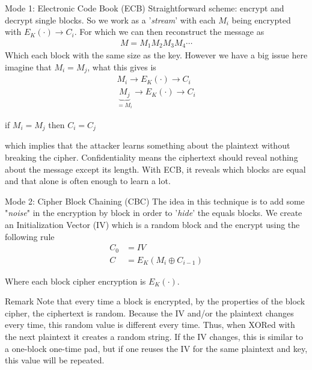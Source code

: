 \begin{parag}{Mode 1: Electronic Code Book (ECB)}
	Straightforward scheme: encrypt and decrypt single blocks. So we work as a '\textit{stream}' with each $M_i$ being encrypted with $E_K\left(\cdot \right) \to C_i$. For which we can then reconstruct the message as 
	\begin{align*} 
		M = M_1M_2M_3M_4\cdots 
	\end{align*}
	Which each block with the same size as the key. However we have a big issue here imagine that $M_i =  M_j$, what this gives is 
	\begin{align*} 
		M_i \to E_K\left(\cdot \right) \to C_i \\
		\underbrace{M_j}_{= M_i} \to E_K\left(\cdot \right) \to C_i
	\end{align*}
	\begin{center}
	    if $M_i = M_j$ then $C_i =  C_j$
	\end{center}
	which implies that the attacker learns something about the plaintext without breaking the cipher. Confidentiality means the ciphertext should reveal nothing about the message except its length. With ECB, it reveals which blocks are equal and that alone is often enough to learn a lot.
	
\end{parag}
\begin{parag}{Mode 2: Cipher Block Chaining (CBC)}
    The idea in this technique is to add some "\textit{noise}" in the encryption by block in order to '\textit{hide}' the equals blocks. We create an Initialization Vector (IV) which is a random block and the encrypt using the following rule 
	\begin{align*} 
		C_0 &=  IV\\
		C &= E_K\left(M_i \oplus C_{i-1}\right)
	\end{align*}
	\begin{center}
	
	\end{center}
	Where each block cipher encryption is $E_K\left(\cdot \right)$.
	\begin{subparag}{Remark}
	    Note that every time a block is encrypted, by the properties of the block cipher, the ciphertext is random. Because the IV and/or the plaintext changes every time, this random value is different every time. Thus, when XORed with the next plaintext it creates a random string. If the IV changes, this is similar to a one-block one-time pad, but if one reuses the IV for the same plaintext and key, this value will be repeated.
	\end{subparag}
\end{parag}
